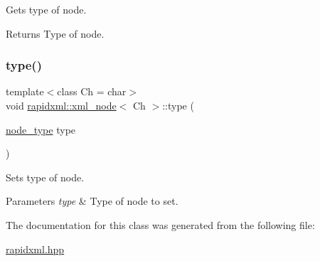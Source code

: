 Gets type of node. \begin{DoxyReturn}{Returns}
Type of node. 
\end{DoxyReturn}
\mbox{\label{classrapidxml_1_1xml__node_a499bbc9300c1b06821d5c08b24164c68}} 
\subsubsection{\texorpdfstring{type()}{type()}\hspace{0.1cm}{\footnotesize\ttfamily [2/2]}}
{\footnotesize\ttfamily template$<$class Ch = char$>$ \\
void \mbox{\hyperlink{classrapidxml_1_1xml__node}{rapidxml\+::xml\+\_\+node}}$<$ Ch $>$\+::type (\begin{DoxyParamCaption}\item[{\mbox{\hyperlink{rapidxml_8hpp_abb456db38f7efb746c4330eed6072a7c}{node\+\_\+type}}}]{type }\end{DoxyParamCaption})\hspace{0.3cm}{\ttfamily [inline]}}

Sets type of node. 
\begin{DoxyParams}{Parameters}
{\em type} & Type of node to set. \\
\hline
\end{DoxyParams}


The documentation for this class was generated from the following file\+:\begin{DoxyCompactItemize}
\item 
\mbox{\hyperlink{rapidxml_8hpp}{rapidxml.\+hpp}}\end{DoxyCompactItemize}
